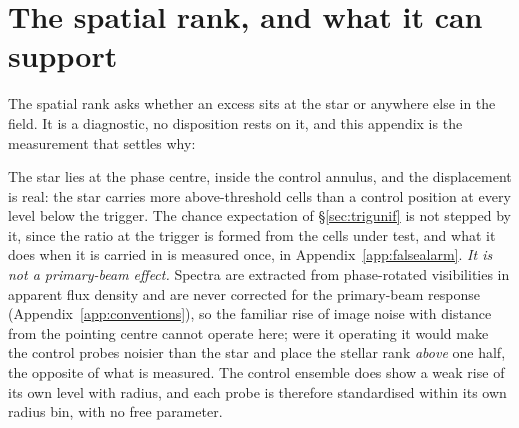 \section{The spatial rank, and what it can support}
\label{app:radius}

The spatial rank asks whether an excess sits at the star or anywhere else in
the field. It is a diagnostic, no disposition rests on it, and this appendix
is the measurement that settles why: \rankstatus{}

The star lies at the phase centre, inside the control annulus, and the
displacement is real: the star carries more above-threshold cells than a
control position at every level below the trigger. The chance expectation of
\S\ref{sec:trigunif} is not stepped by it, since the ratio at the trigger is
formed from the cells under test, and what it does when it is carried in is
measured once, in Appendix~\ref{app:falsealarm}. \emph{It is not a primary-beam effect.} Spectra are
extracted from phase-rotated visibilities in apparent flux density and are never
corrected for the primary-beam response (Appendix~\ref{app:conventions}), so
the familiar rise of image noise with distance from the pointing centre
cannot operate here; were it operating it would make the control probes
noisier than the star and place the stellar rank \emph{above} one half, the
opposite of what is measured. The control ensemble does show
a weak rise of its own level with radius, and each probe is therefore
standardised within its own radius bin, with no free parameter.


